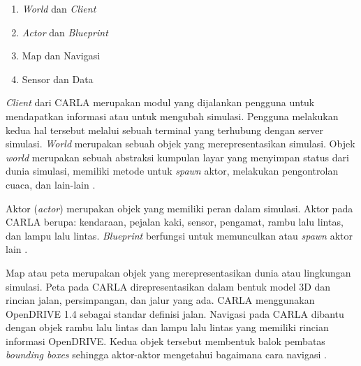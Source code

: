 \begin{enumerate}

    \item \textit{World} dan \textit{Client}
    \item \textit{Actor} dan \textit{Blueprint}
    \item Map dan Navigasi
    \item Sensor dan Data

\end{enumerate}


\textit{Client} dari CARLA merupakan modul yang dijalankan pengguna untuk
mendapatkan informasi atau untuk mengubah simulasi. Pengguna melakukan kedua hal
tersebut melalui sebuah terminal yang terhubung dengan server simulasi.
\textit{World} merupakan sebuah objek yang merepresentasikan simulasi. Objek
\textit{world} merupakan sebuah abstraksi kumpulan layar yang menyimpan status
dari dunia simulasi, memiliki metode untuk \textit{spawn} aktor, melakukan
pengontrolan cuaca, dan lain-lain \parencite{carla-documentation-core-concepts}.


Aktor (\textit{actor}) merupakan objek yang memiliki peran dalam simulasi. Aktor
pada CARLA berupa: kendaraan, pejalan kaki, sensor, pengamat, rambu lalu lintas,
dan lampu lalu lintas. \textit{Blueprint} berfungsi untuk memunculkan atau
\textit{spawn} aktor lain \parencite{carla-documentation-core-concepts}.


Map atau peta merupakan objek yang merepresentasikan dunia atau lingkungan
simulasi. Peta pada CARLA direpresentasikan dalam bentuk model 3D dan rincian
jalan, persimpangan, dan jalur yang ada. CARLA menggunakan OpenDRIVE 1.4 sebagai
standar definisi jalan. Navigasi pada CARLA dibantu dengan objek rambu lalu
lintas dan lampu lalu lintas yang memiliki rincian informasi OpenDRIVE. Kedua
objek tersebut membentuk balok pembatas \textit{bounding boxes} sehingga
aktor-aktor mengetahui bagaimana cara navigasi
\parencite{carla-documentation-core-concepts}.

